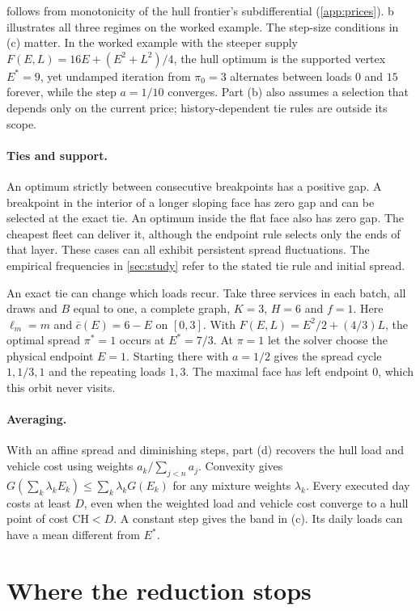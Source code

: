 \documentclass[11pt]{article}
\theoremstyle{definition}\newtheorem{definition}[theorem]{Definition}
\theoremstyle{remark}\newtheorem{remark}[theorem]{Remark}
\newcommand{\CH}{\mathrm{CH}}
\begin{document}
 follows from monotonicity of the hull frontier's
subdifferential (\cref{app:prices}).
b illustrates all three regimes on the worked example. The
step-size conditions in (c) matter. In the worked example with the steeper supply
$F(E,L)=16E+(E^2+L^2)/4$, the hull optimum is the supported vertex $E^*=9$, yet
undamped iteration from $\pi_0=3$ alternates between loads $0$ and $15$ forever,
while the step $a=1/10$ converges. Part (b) also assumes a selection that depends
only on the current price; history-dependent tie rules are outside its scope.

\paragraph{Ties and support.} An optimum strictly between consecutive
breakpoints has a positive gap. A breakpoint in the interior of a longer
sloping face has zero gap and can be selected at the exact tie. An optimum
inside the flat face also has zero gap. The cheapest fleet can deliver it,
although the endpoint rule selects only the ends of that layer. These cases can
all exhibit persistent spread fluctuations. The empirical frequencies in
\cref{sec:study} refer to the stated tie rule and initial spread.

An exact tie can change which loads recur. Take three services in each batch,
all draws and $B$ equal to one, a complete graph, $K=3$, $H=6$ and $f=1$.
Here $\ell_m=m$ and $\bar c(E)=6-E$ on $[0,3]$. With
$F(E,L)=E^2/2+(4/3)L$, the optimal spread $\pi^*=1$ occurs at $E^*=7/3$.
At $\pi=1$ let the solver choose the physical endpoint $E=1$. Starting there
with $a=1/2$ gives the spread cycle $1,1/3,1$ and the repeating loads $1,3$.
The maximal face has left endpoint $0$, which this orbit never visits.

\paragraph{Averaging.} With an affine spread and diminishing steps, part (d)
recovers the hull load and vehicle cost using weights $a_k/\sum_{j<n}a_j$.
Convexity gives $G(\sum_k\lambda_kE_k)\le\sum_k\lambda_k G(E_k)$ for any
mixture weights $\lambda_k$. Every executed day costs at least $D$, even
when the weighted load and vehicle cost converge to a hull point of cost
$\CH<D$. A constant step gives the band in (c). Its daily loads can have a
mean different from $E^*$.

\section{Where the reduction stops}\label{sec:boundaries}
\end{document}
